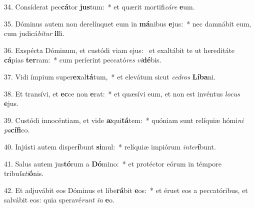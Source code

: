 34. Consíderat pec\textbf{cá}tor \textbf{jus}tum:~*  et quærit mortifi\textit{cá}\textit{re} \textbf{e}um.\

35. Dóminus autem non derelínquet eum in \textbf{má}nibus \textbf{e}jus:~*  nec damnábit eum, cum judicá\textit{bi}\textit{tur} \textbf{il}li.\

36. Exspécta Dóminum, et custódi viam ejus: \dag\  et exaltábit te ut hereditáte \textbf{cá}pias \textbf{ter}ram:~*  cum períerint peccató\textit{res} \textit{vi}\textbf{dé}bis.\

37. Vidi ímpium super\textbf{ex}al\textbf{tá}tum,~*  et elevátum sicut \textit{ce}\textit{dros} \textbf{Lí}\textbf{ba}ni.\

38. Et transívi, et \textbf{ec}ce non \textbf{e}rat:~*  et quæsívi eum, et non est invéntus \textit{lo}\textit{cus} \textbf{e}jus.\

39. Custódi innocéntiam, et vide \textbf{æ}qui\textbf{tá}tem:~*  quóniam sunt relíquiæ hómi\textit{ni} \textit{pa}\textbf{cí}\textbf{fi}co.\

40. Injústi autem disper\textbf{í}bunt \textbf{si}mul:~*  relíquiæ impiórum \textit{in}\textit{ter}\textbf{í}bunt.\

41. Salus autem jus\textbf{tó}rum a \textbf{Dó}mino:~*  et protéctor eórum in témpore tribu\textit{la}\textit{ti}\textbf{ó}nis.\

42. Et adjuvábit eos Dóminus et libe\textbf{rá}bit \textbf{e}os:~*  et éruet eos a peccatóribus, et salvábit eos: quia speravé\textit{runt} \textit{in} \textbf{e}o.\

